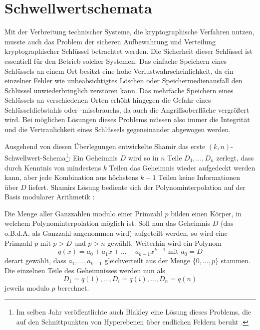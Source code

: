 \section{Schwellwertschemata}

\label{sec_basics_threshold}


Mit der Verbreitung technischer Systeme, die kryptographische Verfahren nutzen, musste auch das Problem der sicheren Aufbewahrung und Verteilung kryptographischer Schlüssel betrachtet werden. Die Sicherheit dieser Schlüssel ist essentiell für den Betrieb solcher Systemen. Das einfache Speichern eines Schlüssels an einem Ort besitzt eine hohe Verlustwahrscheinlichkeit, da ein einzelner Fehler wie unbeabsichtigtes Löschen oder Speichermedienausfall den Schlüssel unwiederbringlich zerstören kann. Das mehrfache Speichern eines Schlüssels an verschiedenen Orten erhöht hingegen die Gefahr eines Schlüsseldiebstahls oder -missbrauchs, da auch die Angriffsoberfläche vergrößert wird. Bei möglichen Lösungen dieses Problems müssen also immer die Integrität und die Vertraulichkeit eines Schlüssels gegeneinander abgewogen werden. \cite{gemmell1997}

Ausgehend von diesen Überlegungen entwickelte Shamir das erste \((k,n)\)-Schwellwert-Schema\footnote{
  Im selben Jahr veröffentlichte auch Blakley eine Lösung dieses Problems, die auf den Schnittpunkten von Hyperebenen über endlichen Feldern beruht \cite{blakley1979}.
}: Ein Geheimnis \(D\) wird so in \(n\) Teile \(D_1, \dots, D_n\) zerlegt, dass durch Kenntnis von mindestens \(k\) Teilen das Geheimnis wieder aufgedeckt werden kann, aber jede Kombination aus höchstens \(k-1\) Teilen keine Informationen über \(D\) liefert. Shamirs Lösung bediente sich der Polynominterpolation auf der Basis modularer Arithmetik \cite{shamir1979}:

Die Menge aller Ganzzahlen modulo einer Primzahl \(p\) bilden einen Körper, in welchem Polynominterpolation möglich ist. Soll nun das Geheimnis \(D\) (das o.B.d.A. als Ganzzahl angenommen wird) aufgeteilt werden, so wird eine Primzahl \(p\) mit \(p > D\) und \(p > n\) gewählt. Weiterhin wird ein Polynom 
\[q(x) = a_0 + a_1x + \dots + a_{k-1}x^{k-1} \text{ mit } a_0 = D\] 
derart gewählt, dass \(a_1, \dots, a_{k-1}\) gleichverteilt aus der Menge \(\{0,\dots,p\}\) stammen. Die einzelnen Teile des Geheimnisses werden nun als
\[D_1=q(1), \dots, D_i=q(i), \dots, D_n=q(n)\]
jeweils modulo \(p\) berechnet.

